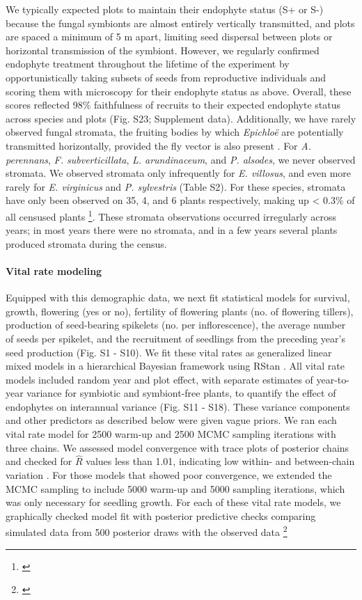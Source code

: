 \documentclass[12pt]{article}
\newcommand{\tom}[2]{{\color{red}{#1}}\footnote{\textit{\color{red}{#2}}}}
\begin{document}
We typically expected plots to maintain their endophyte status (S+ or S-) because the fungal symbionts are almost entirely vertically transmitted, and plots are spaced a minimum of 5 m apart, limiting seed dispersal between plots or horizontal transmission of the symbiont. 
However, we regularly confirmed endophyte treatment throughout the lifetime of the experiment by opportunistically taking subsets of seeds from reproductive individuals and scoring them with microscopy for their endophyte status as above.
Overall, these scores reflected 98\% faithfulness of recruits to their expected endophyte status across species and plots (Fig. S23; Supplement data). 
Additionally, we have rarely observed fungal stromata, the fruiting bodies by which \emph{Epichlo\"e} are potentially transmitted horizontally, provided the fly vector is also present \cite{bultman1995mutualistic}. 
For \emph{A. perennans}, \emph{F. subverticillata}, \emph{L. arundinaceum}, and \emph{P. alsodes}, we never observed stromata. 
We observed stromata only infrequently for \emph{E. villosus}, and even more rarely for \emph{E. virginicus} and \emph{P. sylvestris} (Table S2). 
For these species, stromata have only been observed on 35, 4, and 6 plants respectively, making up < 0.3\% of all censused plants \tom{(Supplemental data)}{I would put these frequencies in the table rather than just yes/no.}.
These stromata observations occurred irregularly across years; in most years there were no stromata, and in a few years several plants produced stromata during the census. 

\paragraph*{Vital rate modeling}
Equipped with this demographic data, we next fit statistical models for survival, growth, flowering (yes or no), fertility of flowering plants (no. of flowering tillers),  production of seed-bearing spikelets (no. per inflorescence), the average number of seeds per spikelet, and the recruitment of seedlings from the preceding year's seed production (Fig. S1 - S10).  
We fit these vital rates as generalized linear mixed models in a hierarchical Bayesian framework  using RStan \cite{rstan2022}. 
All vital rate models included random year and plot effect, with separate estimates of year-to-year variance for symbiotic and symbiont-free plants, to quantify the effect of endophytes on interannual variance (Fig. S11 - S18).
These variance components and other predictors as described below were given vague priors.
We ran each vital rate model for 2500 warm-up and 2500 MCMC sampling iterations with three chains. 
We assessed model convergence with trace plots of posterior chains and checked for $\hat{R}$ values less than 1.01, indicating low within- and between-chain variation \cite{brooks1998general,gelman2006data}. 
For those models that showed poor convergence, we extended the MCMC sampling to include 5000 warm-up and 5000 sampling iterations, which was only necessary for seedling growth. 
For each of these vital rate models, we graphically checked model fit with posterior predictive checks comparing simulated data from 500 posterior draws with the observed data \tom{(Fig. S19-S20).}{It's a litte weird to show these aggregated across species.}
\end{document}
